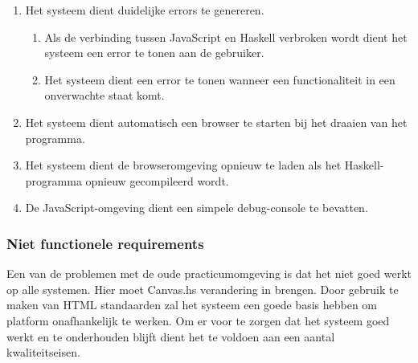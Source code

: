 \begin{enumerate}[{R}1]
\setcounter{enumi}{\value{startvalue}}
	\item Het systeem dient duidelijke errors te genereren.
	\begin{enumerate}
		\item Als de verbinding tussen JavaScript en Haskell verbroken wordt dient het systeem een error te tonen aan de gebruiker. 
		\item Het systeem dient een error te tonen wanneer een functionaliteit in een onverwachte staat komt.
	\end{enumerate}
	\item Het systeem dient automatisch een browser te starten bij het draaien van het programma.
	\item Het systeem dient de browseromgeving opnieuw te laden als het Haskell-programma opnieuw gecompileerd wordt.
	\item De JavaScript-omgeving dient een simpele debug-console te bevatten.
	\setcounter{startvalue}{\value{enumi}}
\end{enumerate}

\subsubsection{Niet functionele requirements}
Een van de problemen met de oude practicumomgeving is dat het niet goed werkt op alle systemen. Hier moet Canvas.hs verandering in brengen. Door gebruik te maken van HTML standaarden zal het systeem een goede basis hebben om platform onafhankelijk te werken. Om er voor te zorgen dat het systeem goed werkt en te onderhouden blijft dient het te voldoen aan een aantal kwaliteitseisen.

